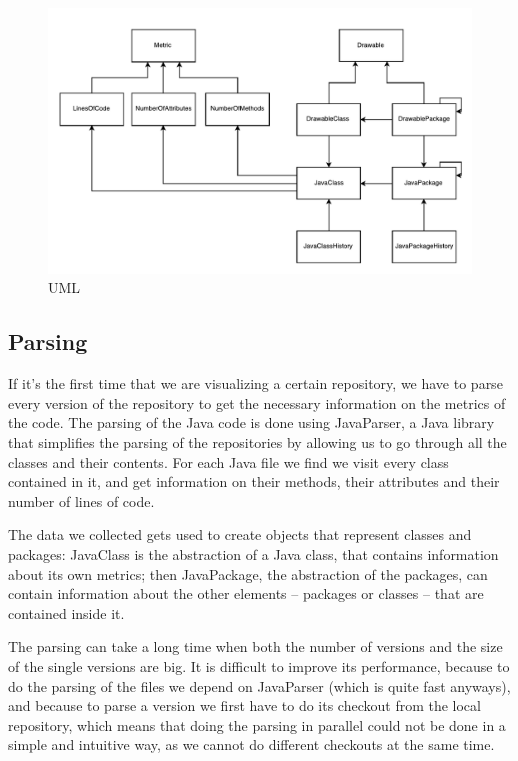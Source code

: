 \documentclass[]{usiinfbachelorproject}
\begin{document}
\begin{figure} [H]
\centering
\includegraphics[width=1\textwidth]{pictures/models.pdf}
\caption{UML}
\label{fig:UML}
\end{figure}

\subsection{Parsing} \label{Parsing}
If it's the first time that we are visualizing a certain repository, we have to parse every version of the repository to get the necessary information on the metrics of the code.
The parsing of the Java code is done using JavaParser, a Java library that simplifies the parsing of the repositories by allowing us to go through all the classes and their contents.
For each Java file we find we visit every class contained in it, and get information on their methods, their attributes and their number of lines of code.

The data we collected gets used to create objects that represent classes and packages: JavaClass is the abstraction of a Java class, that contains information about its own metrics; then JavaPackage, the abstraction of the packages, can contain information about the other elements -- packages or classes -- that are contained inside it.

The parsing can take a long time when both the number of versions and the size of the single versions are big.
It is difficult to improve its performance, because to do the parsing of the files we depend on JavaParser (which is quite fast anyways), and because to parse a version we first have to do its checkout from the local repository, which means that doing the parsing in parallel could not be done in a simple and intuitive way, as we cannot do different checkouts at the same time.
\end{document}
